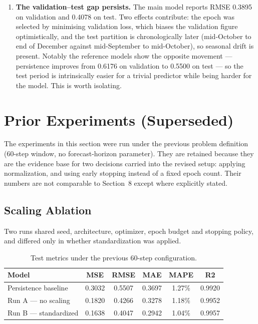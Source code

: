 \documentclass[11pt,a4paper]{article}
\begin{document}
\begin{enumerate}
  \item \textbf{The validation--test gap persists.} The main model reports RMSE 0.3895 on
        validation and 0.4078 on test. Two effects contribute: the epoch was selected by minimising
        validation loss, which biases the validation figure optimistically, and the test partition
        is chronologically later (mid-October to end of December against mid-September to
        mid-October), so seasonal drift is present. Notably the reference models show the opposite
        movement --- persistence improves from 0.6176 on validation to 0.5500 on test --- so the
        test period is intrinsically easier for a trivial predictor while being harder for the
        model. This is worth isolating.
\end{enumerate}


\section{Prior Experiments (Superseded)}
\label{sec:ablation}

The experiments in this section were run under the previous problem definition (60-step window,
no forecast-horizon parameter). They are retained because they are the evidence base for two
decisions carried into the revised setup: applying normalization, and using early stopping instead
of a fixed epoch count. Their numbers are not comparable to Section~8 except where explicitly
stated.

\subsection{Scaling Ablation}

Two runs shared seed, architecture, optimizer, epoch budget and stopping policy, and differed only
in whether standardization was applied.

\begin{table}[H]
\centering
\begin{tabular}{lccccc}
\toprule
\textbf{Model} & \textbf{MSE} & \textbf{RMSE} & \textbf{MAE} & \textbf{MAPE} & \textbf{R2} \\
\midrule
Persistence baseline   & 0.3032 & 0.5507 & 0.3697 & 1.27\% & 0.9920 \\
Run A --- no scaling   & 0.1820 & 0.4266 & 0.3278 & 1.18\% & 0.9952 \\
Run B --- standardized & 0.1638 & 0.4047 & 0.2942 & 1.04\% & 0.9957 \\
\bottomrule
\end{tabular}
\caption{Test metrics under the previous 60-step configuration.}
\end{table}
\end{document}
